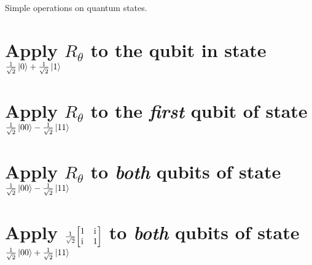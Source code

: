 \documentclass[boxes,pages]{homework}
\newcommand{\iu}{\mathrm{i}\mkern1mu}
\begin{document}
\begin{problem}
Simple operations on quantum states.
\begin{parts}
	\part{Apply $R_\theta$ to the qubit in state $\frac{1}{\sqrt{2}}\ket{0} + \frac{1}{\sqrt{2}}\ket{1}$}\label{part:1a}
	\part{Apply $R_\theta$ to the \emph{first} qubit of state $\frac{1}{\sqrt{2}}\ket{00} - \frac{1}{\sqrt{2}}\ket{11}$}\label{part:1b}
	\part{Apply $R_\theta$ to \emph{both} qubits of state $\frac{1}{\sqrt{2}}\ket{00} - \frac{1}{\sqrt{2}}\ket{11}$}\label{part:1c}
	\part{Apply $\frac{1}{\sqrt{2}}\mqty[1 & \iu \\ \iu & 1]$ to \emph{both} qubits of state $\frac{1}{\sqrt{2}}\ket{00} + \frac{1}{\sqrt{2}}\ket{11}$}\label{part:1d}
\end{parts}
\end{problem}
\end{document}

